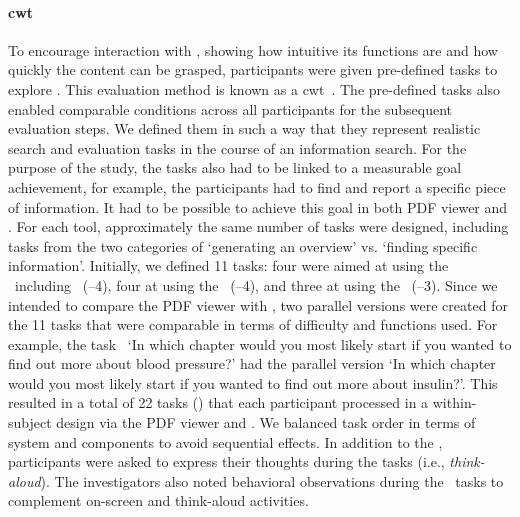\paragraph*{\acrlong{cwt}}
To encourage interaction with \apluschis, showing how intuitive its functions are and how quickly the content can be grasped, participants were given pre-defined tasks to explore \apluschis. 
%
This evaluation method is known as a \acrfull{cwt}~\cite{hollingsed2007usability}.  
%
The pre-defined tasks also enabled comparable conditions across all participants for the subsequent evaluation steps. 
%
We defined them in such a way that they represent realistic search and evaluation tasks in the course of an information search. 
%
For the purpose of the study, the tasks also had to be linked to a measurable goal achievement, for example, the participants had to find and report a specific piece of information. 
%
It had to be possible to achieve this goal in both PDF viewer and \apluschis. 
%
For each tool, approximately the same number of tasks were designed, including tasks from the two categories of `generating an overview' vs. `finding specific information'. 
%
Initially, we defined 11 tasks: four were aimed at using the \WordCloud\ including \Topicbar\ (\taskWcOne--4),
 four at using the \Tilebar\ (\taskTibOne--4), and three at using the \ImageSlider\ (\taskIsOne--3). 
%
Since we intended to compare the PDF viewer with \apluschis, two parallel versions were created for the 11 tasks that were comparable in terms of difficulty and functions used. 
%
For example, the task \taskTibFour\ `In which chapter would you most likely start if you wanted to find out more about blood pressure?' had the parallel version `In which chapter would you most likely start if you wanted to find out more about insulin?'. 
%
This resulted in a total of 22 tasks () that each participant processed in a within-subject design via the PDF viewer and \apluschis. 
%
We balanced task order in terms of system and components to avoid sequential effects. 
%
In addition to the \cwt, participants were asked to express their thoughts during the tasks (i.e., \emph{think-aloud}). 
%
The investigators also noted behavioral observations during the \cwt\ tasks to complement on-screen and think-aloud activities.



